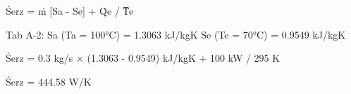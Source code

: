 Śerz = ṁ [Sa - Se] + Q̇e / T̅e  

Tab A-2:  
Sa (Ta = 100°C) = 1.3063 kJ/kgK  
Se (Te = 70°C) = 0.9549 kJ/kgK  

Śerz = 0.3 kg/s × (1.3063 - 0.9549) kJ/kgK + 100 kW / 295 K  

Śerz = 444.58 W/K